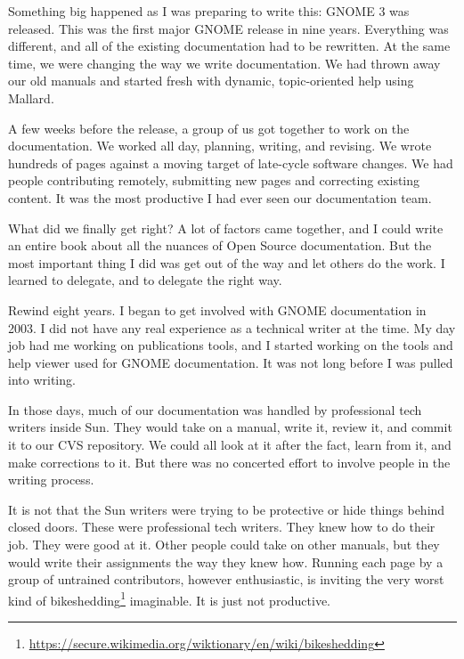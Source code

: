

\noindent{}Something big happened as I was preparing to write this: GNOME 3 was released.
This was the first major GNOME release in nine years. Everything was different,
and all of the existing documentation had to be rewritten. At the same time, we
were changing the way we write documentation. We had thrown away our old manuals
and started fresh with dynamic, topic-oriented help using Mallard.

A few weeks before the release, a group of us got together to work on the
documentation. We worked all day, planning, writing, and revising. We wrote
hundreds of pages against a moving target of late-cycle software changes. We
had people contributing remotely, submitting new pages and correcting existing
content. It was the most productive I had ever seen our documentation team.

What did we finally get right? A lot of factors came together, and I could
write an entire book about all the nuances of Open Source documentation.
But the most important thing I did was get out of the way and let others
do the work. I learned to delegate, and to delegate the right way.

Rewind eight years. I began to get involved with GNOME documentation in 2003.
I did not have any real experience as a technical writer at the time. My day
job had me working on publications tools, and I started working on the tools
and help viewer used for GNOME documentation. It was not long before I was
pulled into writing.

In those days, much of our documentation was handled by professional tech
writers inside Sun. They would take on a manual, write it, review it, and
commit it to our CVS repository. We could all look at it after the fact,
learn from it, and make corrections to it. But there was no concerted
effort to involve people in the writing process.

It is not that the Sun writers were trying to be protective or hide things
behind closed doors. These were professional tech writers. They knew how
to do their job. They were good at it. Other people could take on other
manuals, but they would write their assignments the way they knew how.
Running each page by a group of untrained contributors, however
enthusiastic, is inviting the very worst kind of bikeshedding\footnote{\url{https://secure.wikimedia.org/wiktionary/en/wiki/bikeshedding}}
imaginable. It is just not productive.

